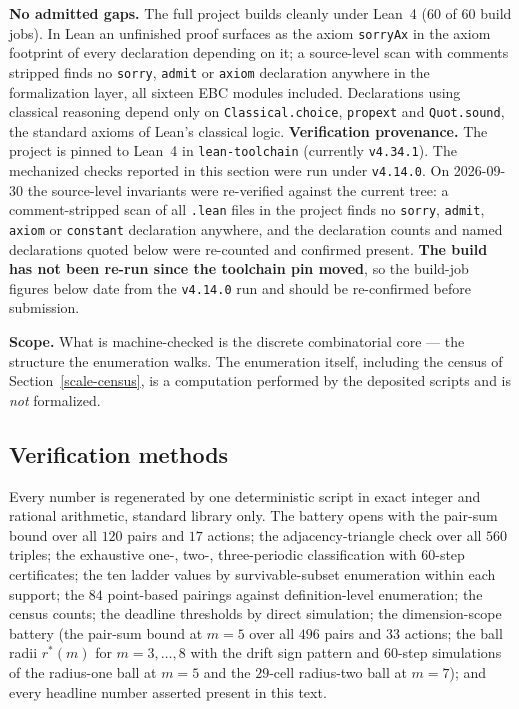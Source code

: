 \documentclass[10pt,twocolumn]{article}
\theoremstyle{plain}
\theoremstyle{definition}
\theoremstyle{remark}
\begin{document}
\noindent\textbf{No admitted gaps.} The full project builds cleanly under Lean~4 (\(60\) of \(60\) build jobs). In Lean an unfinished proof surfaces as the axiom
\texttt{sorryAx} in the axiom footprint of every declaration depending on it; a
source-level scan with comments stripped finds no \texttt{sorry}, \texttt{admit} or
\texttt{axiom} declaration anywhere in the formalization layer, all sixteen EBC modules
included. Declarations using classical reasoning depend only on \texttt{Classical.choice}, \texttt{propext} and \texttt{Quot.sound}, the standard axioms of Lean's classical logic.
\noindent\textbf{Verification provenance.} The project is pinned to Lean~4 in
\texttt{lean-toolchain} (currently \texttt{v4.34.1}). The mechanized checks reported in this
section were run under \texttt{v4.14.0}. On 2026-09-30 the source-level invariants were
re-verified against the current tree: a comment-stripped scan of all \texttt{.lean} files in
the project finds no \texttt{sorry}, \texttt{admit}, \texttt{axiom} or \texttt{constant}
declaration anywhere, and the declaration counts and named declarations quoted below were
re-counted and confirmed present. \textbf{The build has not been re-run since the toolchain
pin moved}, so the build-job figures below date from the \texttt{v4.14.0} run and should be
re-confirmed before submission.


\noindent\textbf{Scope.} What is machine-checked is the discrete combinatorial core --- the
structure the enumeration walks. The enumeration itself, including the census of
Section~\ref{scale-census}, is a computation performed by the deposited scripts and is
\emph{not} formalized.

\subsection{Verification methods}\label{scale-methods}

Every number is regenerated by one deterministic script in exact integer and rational arithmetic, standard library only. The battery opens with the pair-sum bound over all \(120\) pairs and \(17\) actions; the
adjacency-triangle check over all \(560\) triples; the exhaustive
one-, two-, three-periodic classification with \(60\)-step
certificates; the ten ladder values by survivable-subset enumeration
within each support; the \(84\) point-based pairings against
definition-level enumeration; the census counts; the deadline
thresholds by direct simulation; the dimension-scope battery (the
pair-sum bound at \(m = 5\) over all \(496\) pairs and \(33\)
actions; the ball radii \(r^{*}(m)\) for \(m = 3, \dots, 8\) with
the drift sign pattern and \(60\)-step simulations of the radius-one
ball at \(m = 5\) and the \(29\)-cell radius-two ball at
\(m = 7\)); and every headline number asserted present in this
text.
\end{document}
